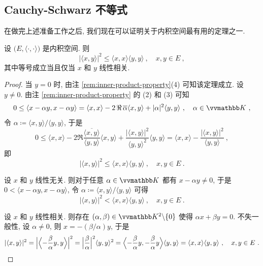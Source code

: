 \subsection{Cauchy-Schwarz 不等式}

在做完上述准备工作之后, 我们现在可以证明关于内积空间最有用的定理之一.

\begin{theorem}\label{thm:cauchy-schwarz-inequality}
    设 \(\bigl(E, \langle \cdot, \cdot \rangle\bigr)\) 是内积空间. 则
    \[
        |\langle x, y \rangle|^2 \leq \langle x, x \rangle \langle y, y \rangle\ ,\quad x, y \in E\ ,
    \]
    其中等号成立当且仅当 \(x\) 和 \(y\) 线性相关.
\end{theorem}

\begin{proof}
    当 \(y = 0\) 时, 由注 \ref{rem:inner-product-property}(4) 可知该定理成立. 设 \(y \neq 0\). 由注 \ref{rem:inner-product-property} 的 (2) 和 (3) 可知
    \[
        0 \leq \langle x - \alpha y, x - \alpha y \rangle = \langle x, x \rangle - 2 \Re \overline \alpha \langle x, y \rangle + |\alpha|^2 \langle y, y \rangle\ ,\quad \alpha \in \K\ ,
    \]
    令 \(\alpha \coloneqq \langle x, y \rangle / \langle y, y \rangle\), 于是
    \[
        0 \leq \langle x, x \rangle - 2 \Re \frac{\overline{\langle x, y \rangle}}{\langle y, y \rangle} \langle x, y \rangle + \frac{|\langle x, y \rangle|^2}{\langle y, y \rangle^2} \langle y, y \rangle = \langle x, x \rangle - \frac{|\langle x, y \rangle|^2}{\langle y, y \rangle}\ ,
    \]
    即
    \[
        |\langle x, y \rangle|^2 \leq \langle x, x \rangle \langle y, y \rangle\ ,\quad x, y \in E\ .
    \]

    设 \(x\) 和 \(y\) 线性无关. 则对于任意 \(\alpha \in \K\) 都有 \(x - \alpha y \neq 0\), 于是 \(0 < \langle x - \alpha y, x - \alpha y \rangle\), 令 \(\alpha \coloneqq \langle x, y \rangle / \langle y, y \rangle\) 可得
    \[
        |\langle x, y \rangle|^2 < \langle x, x \rangle \langle y, y \rangle\ ,\quad x, y \in E\ .
    \]

    设 \(x\) 和 \(y\) 线性相关. 则存在 \((\alpha, \beta) \in \K^2 \backslash \{0\}\) 使得 \(\alpha x + \beta y = 0\). 不失一般性, 设 \(\alpha \neq 0\), 则 \(x = - (\beta / \alpha) y\), 于是
    \[
        |\langle x, y \rangle|^2 = \Bigl|\Bigl\langle - \frac{\beta}{\alpha} y, y \Bigr\rangle\Bigr|^2 = \Bigl|\frac{\beta}{\alpha}\Bigr|^2 \langle y, y \rangle^2 = \Bigl\langle - \frac{\beta}{\alpha} y, - \frac{\beta}{\alpha} y \Bigr\rangle \langle y, y \rangle = \langle x, x \rangle \langle y, y \rangle\ ,\quad x, y \in E\ .
    \]
\end{proof}

